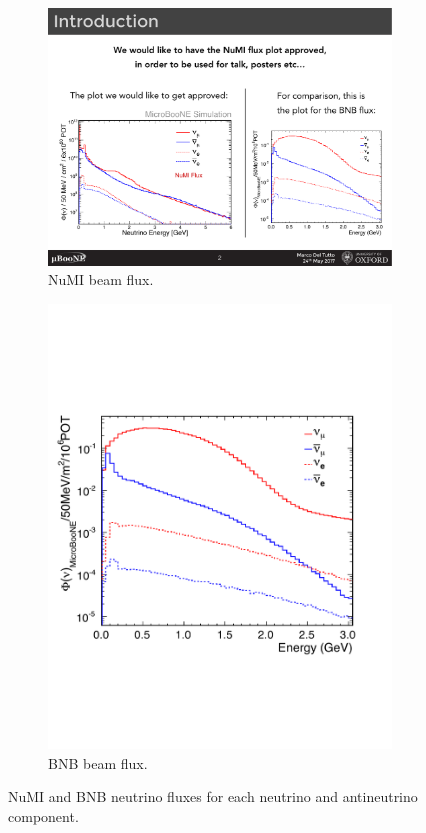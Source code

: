 \begin{figure}[htbp]
\centering
  \begin{subfigure}{0.45\textwidth}
    \includegraphics[width=\linewidth]{figures/numi.pdf}
    \caption{NuMI beam flux.} 
  \end{subfigure}
    \begin{subfigure}{0.45\textwidth}
    \includegraphics[width=\linewidth]{figures/bnb.pdf}
    \caption{BNB beam flux.} 
  \end{subfigure}
  \caption{NuMI and BNB neutrino fluxes for each neutrino and antineutrino component.}\label{fig:numibeam}
\end{figure}

